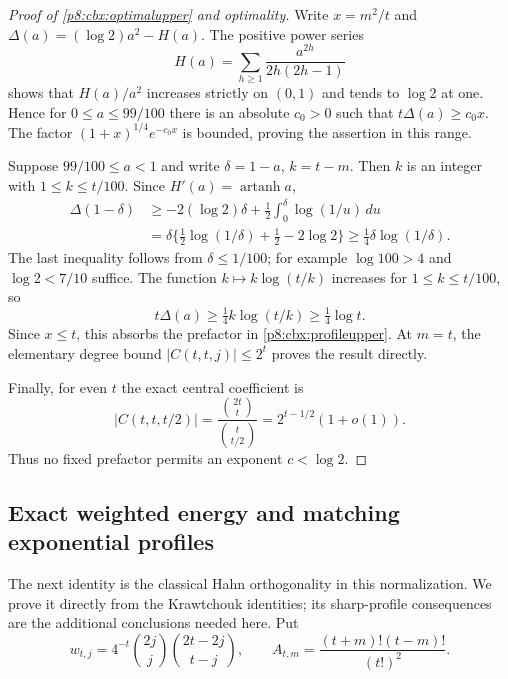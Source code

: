 \documentclass[11pt,a4paper]{article}
\theoremstyle{definition}
\theoremstyle{remark}
\numberwithin{equation}{section}
\begin{document}
\begin{proof}[Proof of \eqref{p8:cbx:optimalupper} and optimality]
Write $x=m^2/t$ and
$\Delta(a)=(\log2)a^2-H(a)$. The positive power series
\[
 H(a)=\sum_{h\ge1}\frac{a^{2h}}{2h(2h-1)}
\]
shows that $H(a)/a^2$ increases strictly on $(0,1)$ and tends to
$\log2$ at one. Hence for $0\le a\le99/100$ there is an absolute
$c_0>0$ such that $t\Delta(a)\ge c_0x$. The factor
$(1+x)^{1/4}e^{-c_0x}$ is bounded, proving the assertion in this range.

Suppose $99/100\le a<1$ and write $\delta=1-a$, $k=t-m$.
Then $k$ is an integer with $1\le k\le t/100$. Since
$H'(a)=\operatorname{artanh}a$,
\begin{align*}
 \Delta(1-\delta)
 &\ge -2(\log2)\delta
            +\tfrac12\int_0^\delta\log(1/u)\,du\\
 &=\delta\{\tfrac12\log(1/\delta)+\tfrac12-2\log2\}
 \ge\tfrac14\delta\log(1/\delta).
\end{align*}
The last inequality follows from $\delta\le1/100$; for example
$\log100>4$ and $\log2<7/10$ suffice. The function
$k\mapsto k\log(t/k)$ increases for $1\le k\le t/100$, so
\[
 t\Delta(a)\ge\tfrac14 k\log(t/k)\ge\tfrac14\log t.
\]
Since $x\le t$, this absorbs the prefactor in
\eqref{p8:cbx:profileupper}. At $m=t$, the elementary degree bound
$|C(t,t,j)|\le2^t$ proves the result directly.

Finally, for even $t$ the exact central coefficient is
\[
 |C(t,t,t/2)|=\frac{\binom{2t}{t}}{\binom t{t/2}}
                 =2^{t-1/2}(1+o(1)).
\]
Thus no fixed prefactor permits an exponent $c<\log2$.
\end{proof}

\subsection{Exact weighted energy and matching exponential profiles}

The next identity is the classical Hahn orthogonality in this
normalization. We prove it directly from the Krawtchouk identities;
its sharp-profile consequences are the additional conclusions needed here.
Put
\[
 w_{t,j}=4^{-t}\binom{2j}{j}\binom{2t-2j}{t-j},\qquad
 A_{t,m}=\frac{(t+m)!(t-m)!}{(t!)^2}.
\]
\end{document}
